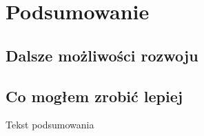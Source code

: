     \chapter{Podsumowanie}\label{ch:podsumowanie}

    \section{Dalsze możliwości rozwoju}\label{sec:dalszeMozliwosciRozwoju}

    \section{Co mogłem zrobić lepiej}\label{sec:coMoglemZrobicLepiej}

    Tekst podsumowania

    
    

    \listoffigures
    \listoftables


